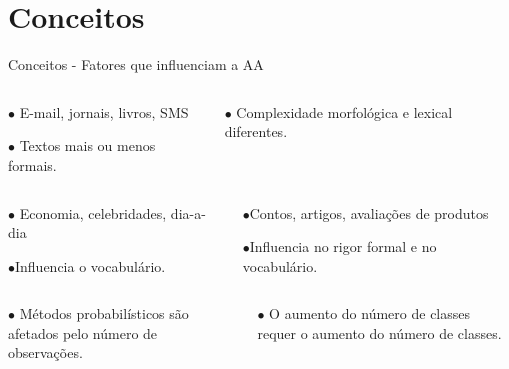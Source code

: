 \section{Conceitos}

\begin{frame}{Conceitos - Fatores que influenciam a AA}

\begin{columns}
	\begin{column}{0.48\textwidth}
		\begin{tcolorbox}[title=Canal,height=2.4cm,valign=center]\selectFont
			$\bullet$ E-mail, jornais, livros, SMS
			
			$\bullet$ Textos mais ou menos formais.                    
		\end{tcolorbox}
	\end{column}
	\begin{column}{0.48\textwidth}
		\begin{tcolorbox}[title=Idioma,height=2.4cm,valign=center]\selectFont
			$\bullet$ Complexidade morfológica e lexical diferentes.
		\end{tcolorbox}
	\end{column}
\end{columns}
\begin{columns}
	\begin{column}{0.48\textwidth}
		\begin{tcolorbox}[title=Tópico,height=2.4cm,valign=center]\selectFont
			$\bullet$ Economia, celebridades, dia-a-dia
			
			$\bullet$Influencia o vocabulário.                    
		\end{tcolorbox}
	\end{column}
	\begin{column}{0.48\textwidth}
		\begin{tcolorbox}[title=Domínio ou Gênero do texto,height=2.4cm,valign=center]\selectFont
			$\bullet$Contos, artigos, avaliações de produtos
			
			$\bullet$Influencia no rigor formal e no vocabulário.
		\end{tcolorbox}
	\end{column}
\end{columns}

\begin{columns}
	\begin{column}{0.48\textwidth}
	\begin{tcolorbox}[title=Tamanho do texto,height=2.4cm,valign=center]
		$\bullet$ Métodos probabilísticos são afetados pelo número de observações.                  
	\end{tcolorbox}
	\end{column}
	\begin{column}{0.48\textwidth}
	\begin{tcolorbox}[title=Número de autores,height=2.4cm,valign=center]
		$\bullet$ O aumento do número de classes requer o aumento do número de classes.                    
	\end{tcolorbox}
	\end{column}
\end{columns}

\end{frame}
